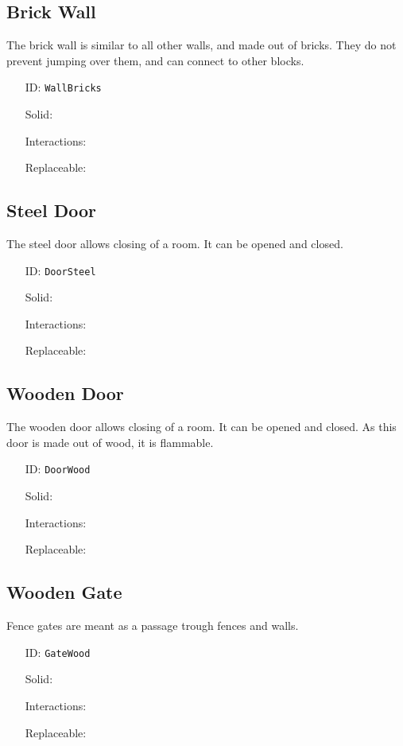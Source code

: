 \subsection{Brick Wall}\label{subsec:blocks_brick wall}
The brick wall is similar to all other walls, and made out of bricks.
They do not prevent jumping over them, and can connect to other blocks.
\newline
\begin{itemize}[nosep]
    \item[ID:] \texttt{WallBricks}
    \item[Solid:]  \Checkmark \item[Interactions:]  \XSolidBrush \item[Replaceable:]  \XSolidBrush
\end{itemize}

\subsection{Steel Door}\label{subsec:blocks_steel door}
The steel door allows closing of a room. It can be opened and closed.
\newline
\begin{itemize}[nosep]
    \item[ID:] \texttt{DoorSteel}
    \item[Solid:]  \Checkmark \item[Interactions:]  \Checkmark \item[Replaceable:]  \XSolidBrush
\end{itemize}

\subsection{Wooden Door}\label{subsec:blocks_wooden door}
The wooden door allows closing of a room. It can be opened and closed.
As this door is made out of wood, it is flammable.
\newline
\begin{itemize}[nosep]
    \item[ID:] \texttt{DoorWood}
    \item[Solid:]  \Checkmark \item[Interactions:]  \Checkmark \item[Replaceable:]  \XSolidBrush
\end{itemize}

\subsection{Wooden Gate}\label{subsec:blocks_wooden gate}
Fence gates are meant as a passage trough fences and walls.
\newline
\begin{itemize}[nosep]
    \item[ID:] \texttt{GateWood}
    \item[Solid:]  \Checkmark \item[Interactions:]  \Checkmark \item[Replaceable:]  \XSolidBrush
\end{itemize}

